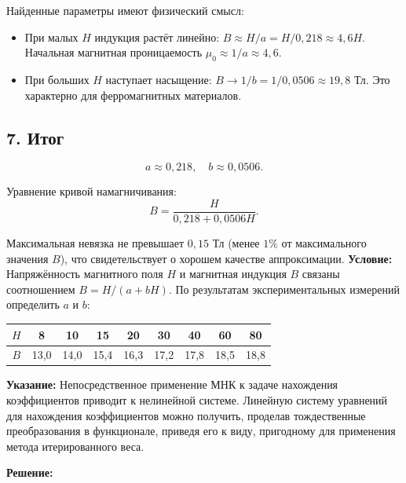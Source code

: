 \documentclass{article}
\begin{document}
Найденные параметры имеют физический смысл:

\begin{itemize}
\item При малых $H$ индукция растёт линейно: $B \approx H/a = H/0{,}218 \approx 4{,}6H$. Начальная магнитная проницаемость $\mu_0 \approx 1/a \approx 4{,}6$.

\item При больших $H$ наступает насыщение: $B \to 1/b = 1/0{,}0506 \approx 19{,}8$ Тл. Это характерно для ферромагнитных материалов.
\end{itemize}

\subsection*{7. Итог}

\begin{equation}
\boxed{a \approx 0{,}218, \quad b \approx 0{,}0506.}
\end{equation}

Уравнение кривой намагничивания:
\begin{equation}
B = \frac{H}{0{,}218 + 0{,}0506H}.
\end{equation}

Максимальная невязка не превышает $0{,}15$ Тл (менее $1\%$ от максимального значения $B$), что свидетельствует о хорошем качестве аппроксимации.
\textbf{Условие:} Напряжённость магнитного поля $H$ и магнитная индукция $B$ связаны соотношением $B = H/(a + bH)$. По результатам экспериментальных измерений определить $a$ и $b$:

\begin{center}
\begin{tabular}{|c|c|c|c|c|c|c|c|c|}
\hline
$H$ & 8 & 10 & 15 & 20 & 30 & 40 & 60 & 80 \\
\hline
$B$ & 13,0 & 14,0 & 15,4 & 16,3 & 17,2 & 17,8 & 18,5 & 18,8 \\
\hline
\end{tabular}
\end{center}

\textbf{Указание:} Непосредственное применение МНК к задаче нахождения коэффициентов приводит к нелинейной системе. Линейную систему уравнений для нахождения коэффициентов можно получить, проделав тождественные преобразования в функционале, приведя его к виду, пригодному для применения метода итерированного веса.

\vspace{0.5cm}
\textbf{Решение:}
\end{document}
